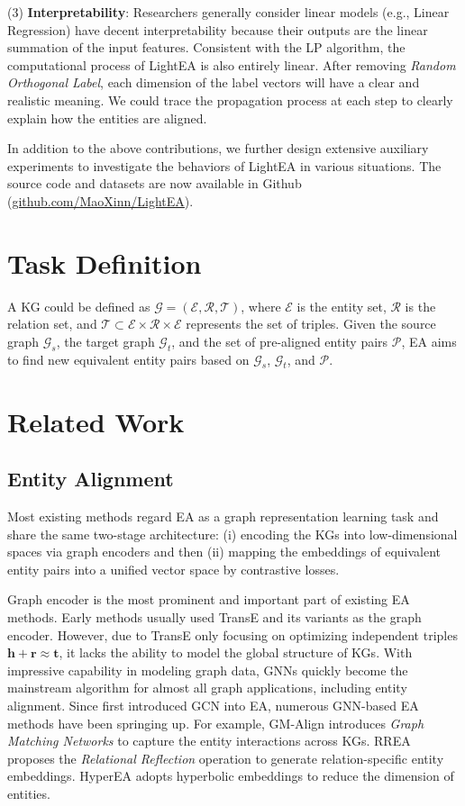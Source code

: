 \documentclass[11pt]{article}
\begin{document}
(3) \textbf{Interpretability}:
Researchers generally consider linear models (e.g., Linear Regression) have decent interpretability because their outputs are the linear summation of the input features.
Consistent with the LP algorithm, the computational process of LightEA is also entirely linear.
After removing \emph{Random Orthogonal Label}, each dimension of the label vectors will have a clear and realistic meaning.
We could trace the propagation process at each step to clearly explain how the entities are aligned.

In addition to the above contributions, we further design extensive auxiliary experiments to investigate the behaviors of LightEA in various situations.
The source code and datasets are now available in Github (\url{github.com/MaoXinn/LightEA}).

\section{Task Definition}
A KG could be defined as $\mathcal{G} = (\mathcal{E},\mathcal{R},\mathcal{T})$, where $\mathcal{E}$ is the entity set, $\mathcal{R}$ is the relation set, and $\mathcal{T}\subset \mathcal{E}\times \mathcal{R}\times \mathcal{E}$ represents the set of triples.
Given the source graph $\mathcal{G}_s$, the target graph $\mathcal{G}_t$, and the set of pre-aligned entity pairs $\mathcal{P}$, EA aims to find new equivalent entity pairs based on $\mathcal{G}_s$, $\mathcal{G}_t$, and $\mathcal{P}$.

\section{Related Work}
\subsection{Entity Alignment}
Most existing methods regard EA as a graph representation learning task and share the same two-stage architecture: (i) encoding the KGs into low-dimensional spaces via graph encoders and then (ii) mapping the embeddings of equivalent entity pairs into a unified vector space by contrastive losses.

Graph encoder is the most prominent and important part of existing EA methods.
Early methods usually used TransE \cite{DBLP:conf/nips/BordesUGWY13} and its variants as the graph encoder.
However, due to TransE only focusing on optimizing independent triples $\bm h + \bm r \approx \bm t$, it lacks the ability to model the global structure of KGs.
With impressive capability in modeling graph data, GNNs quickly become the mainstream algorithm for almost all graph applications, including entity alignment.
Since \citet{DBLP:conf/emnlp/WangLLZ18} first introduced GCN into EA, numerous GNN-based EA methods have been springing up.
For example, GM-Align \cite{DBLP:conf/acl/XuWYFSWY19} introduces \emph{Graph Matching Networks} to capture the entity interactions across KGs.
RREA \cite{DBLP:conf/cikm/MaoWXWL20} proposes the \emph{Relational Reflection} operation to generate relation-specific entity embeddings.
HyperEA \cite{DBLP:conf/emnlp/SunCHWDZ20} adopts hyperbolic embeddings to reduce the dimension of entities.
\end{document}
